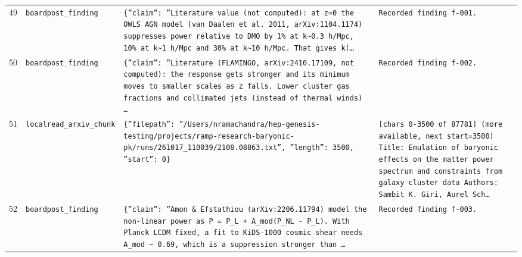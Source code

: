\documentclass[11pt,a4paper]{article}
\begin{document}
\begin{longtable}{@{}p{}p{}p{}p{}@{}}
49 & \texttt{board}\newline\texttt{post\_\allowbreak{}finding} & \texttt{\{''claim'':\allowbreak{} ''Literature value (not computed)\allowbreak{}:\allowbreak{} at z=\allowbreak{}0 the OWLS AGN model (van Daalen et al. 2011,\allowbreak{} arXiv:\allowbreak{}1104.1174)\allowbreak{} suppresses power relative to DMO by 1\% at k\textasciitilde{}\allowbreak{}0.3 h/\allowbreak{}Mpc,\allowbreak{} 10\% at k\textasciitilde{}\allowbreak{}1 h/\allowbreak{}Mpc and 30\% at k\textasciitilde{}\allowbreak{}10 h/\allowbreak{}Mpc. That gives k(\ldots{}\allowbreak{}} & \texttt{Recorded finding f-001.} \\
50 & \texttt{board}\newline\texttt{post\_\allowbreak{}finding} & \texttt{\{''claim'':\allowbreak{} ''Literature (FLAMINGO,\allowbreak{} arXiv:\allowbreak{}2410.17109,\allowbreak{} not computed)\allowbreak{}:\allowbreak{} the response gets stronger and its minimum moves to smaller scales as z falls. Lower cluster gas fractions and collimated jets (instead of thermal winds)\allowbreak{} \ldots{}\allowbreak{}} & \texttt{Recorded finding f-002.} \\
51 & \texttt{local}\newline\texttt{read\_\allowbreak{}arxiv\_\allowbreak{}chunk} & \texttt{\{''filepath'':\allowbreak{} ''/\allowbreak{}Users/\allowbreak{}nramachandra/\allowbreak{}hep-genesis-testing/\allowbreak{}projects/\allowbreak{}ramp-research-baryonic-pk/\allowbreak{}runs/\allowbreak{}261017\_\allowbreak{}110039/\allowbreak{}2108.08863.txt'',\allowbreak{} ''length'':\allowbreak{} 3500,\allowbreak{} ''start'':\allowbreak{} 0\}\allowbreak{}} & \texttt{[chars 0-3500 of 87781]\allowbreak{} (more available,\allowbreak{} next start=\allowbreak{}3500)\allowbreak{}  Title:\allowbreak{} Emulation of baryonic effects on the matter power spectrum and constraints from galaxy cluster data Authors:\allowbreak{} Sambit K. Giri,\allowbreak{} Aurel Sch\ldots{}\allowbreak{}} \\
52 & \texttt{board}\newline\texttt{post\_\allowbreak{}finding} & \texttt{\{''claim'':\allowbreak{} ''Amon \& Efstathiou (arXiv:\allowbreak{}2206.11794)\allowbreak{} model the non-linear power as P =\allowbreak{} P\_\allowbreak{}L + A\_\allowbreak{}mod(P\_\allowbreak{}NL - P\_\allowbreak{}L)\allowbreak{}. With Planck LCDM fixed,\allowbreak{} a fit to KiDS-1000 cosmic shear needs A\_\allowbreak{}mod \textasciitilde{}\allowbreak{} 0.69,\allowbreak{} which is a suppression stronger than \ldots{}\allowbreak{}} & \texttt{Recorded finding f-003.} \\

\end{longtable}
\end{document}
